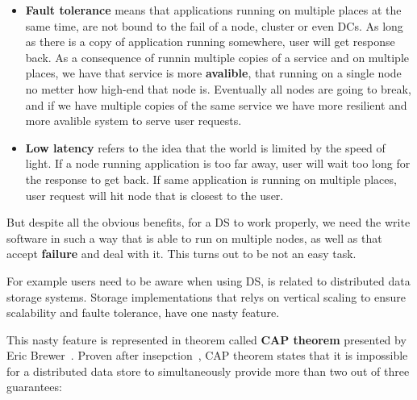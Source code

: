 \begin{itemize}
	\item \textbf{Fault tolerance} means that applications running on multiple places at the same time, are not bound to the fail of a node, cluster or even DCs. As long as there is a copy of application running somewhere, user will get response back. As a consequence of runnin multiple copies of a service and on multiple places, we have that service is more \textbf{avalible}, that running on a single node no metter how high-end that node is. Eventually all nodes are going to break, and if we have multiple copies of the same service we have more resilient and more avalible system to serve user requests.
	\item \textbf{Low latency} refers to the idea that the world is limited by the speed of light. If a node running application is too far away, user will wait too long for the response to get back. If same application is running on multiple places, user request will hit node that is closest to the user.
\end{itemize}

But despite all the obvious benefits, for a DS to work properly, we need the write software in such a way that is able to run on multiple nodes, as well as that accept \textbf{failure} and deal with it. This turns out to be not an easy task.

For example users need to be aware when using DS, is related to distributed data storage systems. Storage implementations that relys on vertical scaling to ensure scalability and faulte tolerance, have one nasty feature. 

This nasty feature is represented in theorem called \textbf{CAP theorem} presented by Eric Brewer~\cite{Brewer2000}. Proven after insepction~\cite{GilbertL02}, CAP theorem states that it is impossible for a distributed data store to simultaneously provide more than two out of three guarantees:

